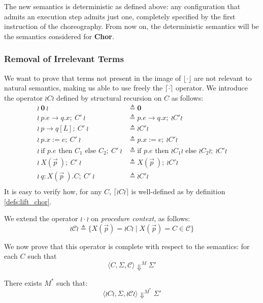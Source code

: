 \documentclass[12pt,a4paper,twoside]{book}
\begin{document}
The new semantics is deterministic as defined above: any configuration that admits an execution step admits just one, completely specified by the first instruction of the choreography. From now on, the deterministic semantics will be the semantics considered for \textbf{Chor}.

\subsubsection{Removal of Irrelevant Terms}
We want to prove that terms not present in the image of $\lfloor \cdot \rfloor$ are not relevant to natural semantics, making us able to use freely the $\lceil \cdot \rceil$ operator. We introduce the operator $\wr C \wr$ defined by structural recursion on $C$ as follows:
\begin{align*}
	\wr~\boldsymbol{0}~\wr &\triangleq \boldsymbol{0} \\
	\wr~p.e \rightarrow q.x;~ C'~\wr &\triangleq p.e \rightarrow q.x;~ \wr C' \wr \\
	\wr~p \rightarrow q[L];~ C'~\wr &\triangleq \wr C' \wr \\
	\wr~p.x := e;~ C'~\wr &\triangleq p.x := e;~ \wr C' \wr \\
	\wr~\text{if } p.e \text{ then } C_1 \text{ else } C_2;~ C'~\wr &\triangleq \text{if } p.e \text{ then } \wr C_1\wr \text{ else } \wr C_2\wr ;~ \wr C'\wr \\
	\wr~X(\vec{p}~);~ C'~\wr &\triangleq X(\vec{p}~);~ \wr C' \wr \\
	\wr~q : X(\vec{p}~).C;~ C'~\wr &\triangleq \wr C' \wr \\
\end{align*}
It is easy to verify how, for any $C$, $\lceil \wr C \wr \rceil$ is well-defined as by definition \ref{defs:lift_chor}.

We extend the operator $\wr \cdot \wr$ on \emph{procedure context}, as follows:
$$
\wr\mathscr{C}\wr \triangleq
\{X(\vec{p}) = \wr C \wr \mid X(\vec{p}) = C \in \mathscr{C}\}
$$

We now prove that this operator is complete with respect to the semantics: for each $C$ such that
$$
\langle C, \Sigma, \mathscr{C} \rangle \Downarrow^M \Sigma'
$$

There exists $M^*$ such that:
\begin{equation}
\label{aux:compl_wr}
	\langle \wr C \wr, \Sigma, \wr\mathscr{C}\wr \rangle \Downarrow^{M^*} \Sigma'
\end{equation}
\end{document}
